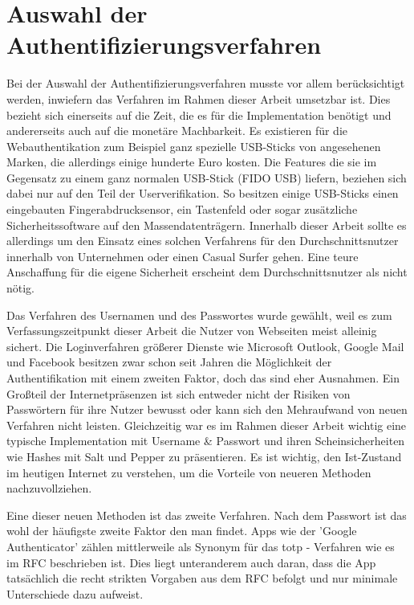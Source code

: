 \section{Auswahl der Authentifizierungsverfahren}
Bei der Auswahl der Authentifizierungsverfahren musste vor allem berücksichtigt werden, inwiefern das Verfahren im Rahmen dieser Arbeit umsetzbar ist. Dies bezieht sich einerseits auf die Zeit, die es für die Implementation benötigt und andererseits auch auf die monetäre Machbarkeit. Es existieren für die Webauthentikation zum Beispiel ganz spezielle USB-Sticks von angesehenen Marken, die allerdings einige hunderte Euro kosten. Die Features die sie im Gegensatz zu einem ganz normalen USB-Stick (FIDO USB) liefern, beziehen sich dabei nur auf den Teil der Userverifikation. So besitzen einige USB-Sticks einen eingebauten Fingerabdrucksensor, ein Tastenfeld oder sogar zusätzliche Sicherheitssoftware auf den Massendatenträgern. Innerhalb dieser Arbeit sollte es allerdings um den Einsatz eines solchen Verfahrens für den Durchschnittsnutzer innerhalb von Unternehmen oder einen Casual Surfer gehen. Eine teure Anschaffung für die eigene Sicherheit erscheint dem Durchschnittsnutzer als nicht nötig.

Das Verfahren des Usernamen und des Passwortes wurde gewählt, weil es zum Verfassungszeitpunkt dieser Arbeit die Nutzer von Webseiten meist alleinig sichert. Die Loginverfahren größerer Dienste wie Microsoft Outlook, Google Mail und Facebook besitzen zwar schon seit Jahren die Möglichkeit der Authentifikation mit einem zweiten Faktor, doch das sind eher Ausnahmen. Ein Großteil der Internetpräsenzen ist sich entweder nicht der Risiken von Passwörtern für ihre Nutzer bewusst oder kann sich den Mehraufwand von neuen Verfahren nicht leisten. Gleichzeitig war es im Rahmen dieser Arbeit wichtig eine typische Implementation mit Username \& Passwort und ihren Scheinsicherheiten wie Hashes mit Salt und Pepper zu präsentieren. Es ist wichtig, den Ist-Zustand im heutigen Internet zu verstehen, um die Vorteile von neueren Methoden nachzuvollziehen.

Eine dieser neuen Methoden ist das zweite Verfahren. Nach dem Passwort ist das wohl der häufigste zweite Faktor den man findet. Apps wie der 'Google Authenticator' zählen mittlerweile als Synonym für das \ac{totp} - Verfahren wie es im RFC beschrieben ist. Dies liegt unteranderem auch daran, dass die App tatsächlich die recht strikten Vorgaben aus dem RFC befolgt und nur minimale Unterschiede dazu aufweist.
\newpage


